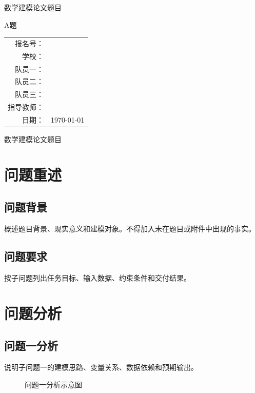 \documentclass[UTF8,a4paper,12pt]{ctexart}
\newcommand{\papertitle}{数学建模论文题目}
\newcommand{\contestproblem}{A题}
\newcommand{\registrationnumber}{}
\newcommand{\schoolname}{}
\newcommand{\teammembera}{}
\newcommand{\teammemberb}{}
\newcommand{\teammemberc}{}
\newcommand{\supervisorname}{}
\newcommand{\submitdate}{\today}
\newcommand{\keywords}[1]{\par\vspace{0.8em}\noindent\textbf{关键词：} #1}
\newcommand{\makecoverinfo}{
  \begin{titlepage}
    \centering
    \vspace*{1.5cm}
    {\zihao{2}\heiti \papertitle \par}
    \vspace{1.5cm}
    {\zihao{4} \contestproblem \par}
    \vspace{2cm}
    \begin{tabular}{rl}
      报名号： & \registrationnumber \\
      学校： & \schoolname \\
      队员一： & \teammembera \\
      队员二： & \teammemberb \\
      队员三： & \teammemberc \\
      指导教师： & \supervisorname \\
      日期： & \submitdate \\
    \end{tabular}
    \vfill
  \end{titlepage}
}
\newcommand{\problemabstract}[3]{
  \noindent\textbf{针对#1}，#2 #3\par\vspace{0.4em}
}
\begin{document}
\makecoverinfo

\begin{center}
  {\heiti \papertitle}
\end{center}

\begin{abstract}
本文围绕题目要求，建立可复现的数学模型，并通过程序求解、结构化验证报告和敏感性分析保证结果可靠。摘要应采用逐问题摘要写法，每一段对应一个子问题，明确说明模型、求解方法、关键结果和结论。

\problemabstract{问题一}{概述所用模型与主要求解流程。}{写入经 result registry 批准的关键结果。}
\problemabstract{问题二}{概述改进模型、约束处理或优化算法。}{写入经 verification report 通过的核心结论。}
\problemabstract{问题三}{概述扩展情形、参数变化或多因素耦合处理。}{写入敏感性分析与稳健性结论。}
\problemabstract{问题四}{概述最终方案、推广或调整策略。}{写入最终建议和适用边界。}

\keywords{数学建模；模型验证；敏感性分析；结果注册表；论文质量审计}
\end{abstract}


\section{问题重述}
\subsection{问题背景}
概述题目背景、现实意义和建模对象。不得加入未在题目或附件中出现的事实。

\subsection{问题要求}
按子问题列出任务目标、输入数据、约束条件和交付结果。

\section{问题分析}
\subsection{问题一分析}
说明子问题一的建模思路、变量关系、数据依赖和预期输出。

\begin{figure}[H]
  \centering
  \caption{问题一分析示意图}
  \label{fig:q1-analysis}
\end{figure}
\end{document}
